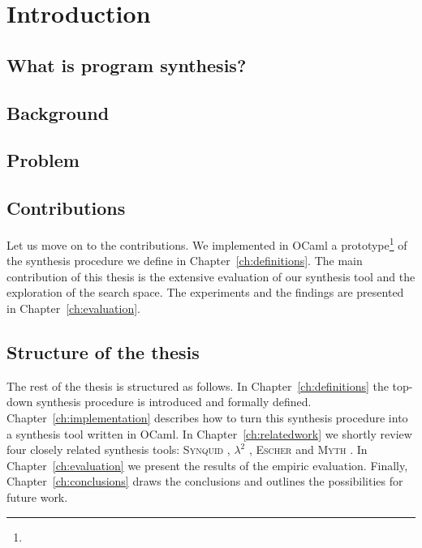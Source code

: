\newcommand{\package}{\emph}

\chapter{Introduction}\label{ch:introduction}


\section{What is program synthesis?}

\section{Background}

\section{Problem}


\section{Contributions}

Let us move on to the contributions. We implemented in OCaml a prototype\footnote{} of the synthesis procedure we define in Chapter~\ref{ch:definitions}. The main contribution of this thesis is the extensive evaluation of our synthesis tool and the exploration of the search space. The experiments and the findings are presented in Chapter~\ref{ch:evaluation}.

\section{Structure of the thesis}

The rest of the thesis is structured as follows. In Chapter~\ref{ch:definitions} the top-down synthesis procedure is introduced and formally defined. Chapter~\ref{ch:implementation} describes how to turn this synthesis procedure into a synthesis tool written in OCaml. In Chapter~\ref{ch:relatedwork} we shortly review four closely related synthesis tools: \textsc{Synquid} \cite{SynquidPaper}, $\lambda^2$ \cite{LambdaSquarePaper}, \textsc{Escher} \cite{EscherPaper} and \textsc{Myth} \cite{Mythpaper}. In Chapter~\ref{ch:evaluation} we present the results of the empiric evaluation. Finally, Chapter~\ref{ch:conclusions} draws the conclusions and outlines the possibilities for future work.



